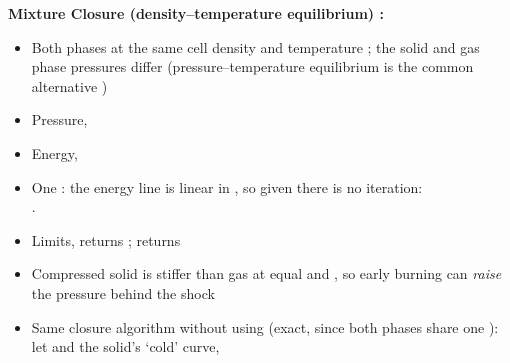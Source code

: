 \documentclass[11pt,addpoints]{exam}
\begin{document}
\clearpage

\begin{tcolorbox}[breakable]
\textbf{Mixture Closure (density--temperature equilibrium) \cite{ruggirello2023,kittell2018}:}\vspace{.5em}
\begin{itemize}
\item Both phases at the same cell density \bm{$\rho$} and temperature ; \hspace{2mm} the solid and gas phase pressures differ \hspace{3mm} (pressure--temperature equilibrium is the common alternative \cite{ruggirello2023})\vspace{.5em}
\item Pressure, \hspace{3mm} \vspace{.5em}
\item Energy, \hspace{3mm} \vspace{.5em}
\item One : the energy line is linear in , so given  there is no iteration:\vspace{.5em} \\
.~~~~~~~~~~\vspace{.5em}
\item Limits, \hspace{3mm}  returns ; \hspace{2mm}  returns \vspace{.5em}
\item Compressed solid is stiffer than gas at equal \bm{$\rho$} and , so early burning can \emph{raise} the pressure behind the shock\vspace{.5em}
\item Same closure algorithm without using  (exact, since both phases share one ): \hspace{2mm} let  and the solid's  `cold' curve,\vspace{.5em} \\

\end{itemize}
\end{tcolorbox}
\end{document}
